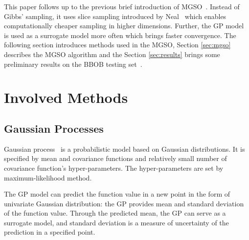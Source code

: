 \documentclass{itatnew}
\begin{document}
This paper follows up to the previous brief introduction of MGSO~\cite{bajer_model_2013}. Instead of Gibbs' sampling, it uses slice sampling introduced by Neal~\cite{neal_slice_2003} which enables computationally cheaper sampling in higher dimensions. Further, the GP model is used as a surrogate model more often which brings faster convergence. The following section introduces methods used in the MGSO, Section \ref{sec:mgso} describes the MGSO algorithm and the Section \ref{sec:results} brings some preliminary results on the BBOB testing set~\cite{hansen_real_2009}.


\section{Involved Methods}

\subsection{Gaussian Processes}

Gaussian process~\cite{rasmussen_gaussian_2006} is a probabilistic model based on Gaussian distributions. 
It is specified by mean and covariance functions and relatively small number of covariance function's hyper-parameters. 
The hyper-parameters are set by maximum-likelihood method.

The GP model can predict the function value in a new point in the form of univariate Gaussian distribution: the GP provides mean and standard deviation of the function value. Through the predicted mean, the GP can serve as a surrogate model, and standard deviation is a measure of uncertainty of the prediction in a specified point.
\end{document}

